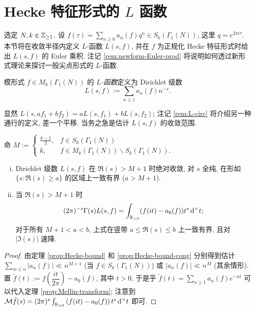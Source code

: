 \section{Hecke 特征形式的 \texorpdfstring{$L$}{L} 函数}\label{sec:L-fcn}
选定 $N,k \in \mathbb{Z}_{\geq 1}$. 设 $f(\tau) = \sum_{n \geq 0} a_n(f) q^n \in S_k(\Gamma_1(N))$, 这里 $q = e^{2\pi i\tau}$. 本节将在收敛半径内定义 $L$-函数 $L(s,f)$, 并在 $f$ 为正规化 Hecke 特征形式时给出 $L(s,f)$ 的 Euler 乘积. 注记 \ref{rem:newform-Euler-prod} 将说明如何透过新形式理论来探讨一般尖点形式的 $L$-函数.

\begin{definition}
	模形式 $f \in M_k(\Gamma_1(N))$ 的 \emph{$L$-函数}定义为 Dirichlet 级数
	\[ L(s,f) := \sum_{n \geq 1} a_n(f) n^{-s}. \]
\end{definition}

显然 $L(s, af_1 + bf_2) = aL(s, f_1) + bL(s, f_2)$; 注记 \ref{rem:L-circ} 将介绍另一种通行的定义, 差一个平移. 当务之急是估计 $L(s,f)$ 的收敛范围.

\begin{lemma}\label{prop:L-series-conv} 
	命
	$ M := \begin{cases}
		\frac{k-1}{2}, & f \in S_k(\Gamma_1(N)) \\
		k, & f \in M_k(\Gamma_1(N)) \smallsetminus S_k(\Gamma_1(N)).
	\end{cases}$
	\begin{enumerate}[(i)]
		\item Dirichlet 级数 $L(s,f)$ 在 $\Re(s) > M + 1$ 时绝对收敛, 对 $s$ 全纯, 在形如 $\{s: \Re(s) \geq a \}$ 的区域上一致有界 ($a > M + 1$).
		\item 当 $\Re(s) > M + 1$ 时
		\[ (2\pi)^{-s} \Gamma(s) L(s,f) = \int_{\mathbb{R}_{>0}} (f(it) - a_0(f) ) t^s \mathop{}\!\mathrm{d}^\times t ; \]
		对于所有 $M+1 < a < b$, 上式在竖带 $a \leq \Re(s) \leq b$ 上一致有界, 且对 $|\Im(s)|$ 速降.
	\end{enumerate}
\end{lemma}
\begin{proof}
	由定理 \ref{prop:Hecke-bound} 和 \ref{prop:Hecke-bound-cong} 分别得到估计 $\sum_{m \leq n} |a_n(f)| \ll n^{M+1}$ (当 $f \in S_k(\Gamma_1(N))$) 或 $|a_n(f)| \ll n^M$ (其余情形). 置 $\tilde{f}(t) := f\left(\dfrac{it}{2\pi}\right) - a_0(f)$, 其中 $t > 0$, 于是乎 $\tilde{f}(t) = \sum_{n \geq 1} a_n(f) e^{-nt}$ 可以代入定理 \ref{prop:Mellin-transform}; 注意到 $\mathcal{M}\tilde{f}(s) = (2\pi)^s \int_{\mathbb{R}_{>0}} \left( f(it) - a_0(f) \right) t^s \mathop{}\!\mathrm{d}^\times t$ 即可.
\end{proof}

